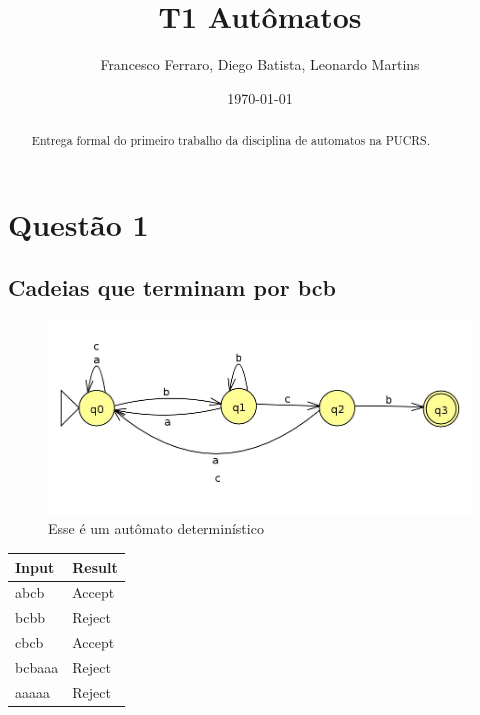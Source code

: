 \documentclass[11pt]{article}
\author{Francesco Ferraro, Diego Batista, Leonardo Martins}
\date{\today}
\title{T1 Autômatos}
\begin{document}
\maketitle
\begin{abstract}
Entrega formal do primeiro trabalho da disciplina de automatos na PUCRS.
\end{abstract}

\section{Questão 1}
\label{sec:orgdda0975}

\subsection{Cadeias que terminam por bcb}
\label{sec:org8cb78a5}
\begin{figure}[htbp]
\centering
\includegraphics[width=.9\linewidth]{./q1/a/q1a.jpg}
\caption{\label{fig:orgb98f3bb}
Esse é um autômato determinístico}
\end{figure}

\begin{center}
\begin{tabular}{ll}
Input & Result\\
\hline
abcb & Accept\\
bcbb & Reject\\
cbcb & Accept\\
bcbaaa & Reject\\
aaaaa & Reject\\
\end{tabular}
\end{center}
\end{document}

